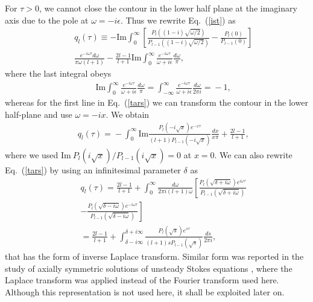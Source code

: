 \documentclass[aps,prx,twocolumn,amsmath,amssymb,amsfonts]{revtex4-2}
\newcommand{\rIm}{\mathrm{Im}}
\begin{document}
For $\tau>0$, we cannot close the contour in the lower half plane at the imaginary axis due to the pole at $\omega=-i\epsilon$. Thus we rewrite Eq.~(\ref{ist}) as
\begin{eqnarray}&&
q_l(\tau)\equiv - \rIm \int_{0}^{\infty}  \left[\frac{P_l\left((1-i)\sqrt{\omega/2}\right)}{P_{l-1}\left((1-i)\sqrt{\omega/2}\right)}-\frac{P_l\left(0\right)}{P_{l-1}\left(0\right)}\right]
\nonumber\\&&
 \frac{e^{-i \omega \tau} d\omega}{\pi\omega(l+1)}
-\frac{2l-1}{l+1} \rIm \int_{0}^{\infty}  \frac{e^{-i \omega \tau}}{\omega+i\epsilon} \frac{d\omega}{\pi}, \label{tars}
\end{eqnarray}
where the last integral obeys
\begin{eqnarray}&&\!\!\!\!\!\!
\rIm \int_{0}^{\infty}\!\!  \frac{e^{-i \omega \tau}}{\omega\!+\!i\epsilon} \frac{d\omega}{\pi}\!=\!\int_{-\infty}^{\infty}  \frac{e^{-i \omega \tau}}{\omega\!+\!i\epsilon} \frac{d\omega}{2\pi i}\!=\!-1,
\end{eqnarray}
whereas for the first line in Eq.~(\ref{tars}) we can transform the contour in the lower half-plane and use $\omega=-ix$. We obtain
\begin{eqnarray}&&\!\!\!\!\!\!
q_l(\tau)\!= \!\!-\int_{0}^{\infty}\!\!\rIm \frac{P_l\left(-i\sqrt{x}\right) e^{-x \tau}}{(l\!+\!1)P_{l-1}\left(-i\sqrt{x}\right)} \frac{dx}{x\pi}
\!+\!\frac{2l\!-\!1}{l+1}, \label{chec}
\end{eqnarray}
where we used $\rIm\  P_l\left(i\sqrt{x}\right)/P_{l-1}\left(i\sqrt{x}\right)=0$ at $x=0$. We can also rewrite Eq.~(\ref{tars}) by using an infinitesimal parameter $\delta$ as
\begin{eqnarray}&&
q_l(\tau)\!=\!\!\frac{2l\!-\!1}{l+1}+\int_{0}^{\infty}\!\!\!\!\frac{d\omega}{2\pi i (l+1)\omega} \left[\frac{P_l\left(\sqrt{\delta\!+\!i\omega}\right)e^{i \omega \tau}}{P_{l-1}\left(\sqrt{\delta\!+\!i\omega}\right)}
\right.\nonumber\\&&\left.
-\frac{P_l\left(\sqrt{\delta\!-\!i\omega}\right)e^{-i \omega \tau}} {P_{l-1}\left(\sqrt{\delta\!-\!i\omega}\right)}\right]
\nonumber\\&& =\frac{2l\!-\!1}{l+1} +\int_{\delta-i\infty}^{\delta+i\infty}  \frac{P_l\left(\sqrt{s}\right)e^{s \tau}}{(l+1)sP_{l-1}\left(\sqrt{s}\right)} \frac{ds}{2\pi i}, \label{lap}
\end{eqnarray}
that has the form of inverse Laplace transform. Similar form was reported in the study of axially symmetric solutions of unsteady Stokes equations \cite{Ishimoto}, where the Laplace transform was applied instead of the Fourier transform used here. Although this representation is not used here, it shall be exploited later on.
\end{document}

